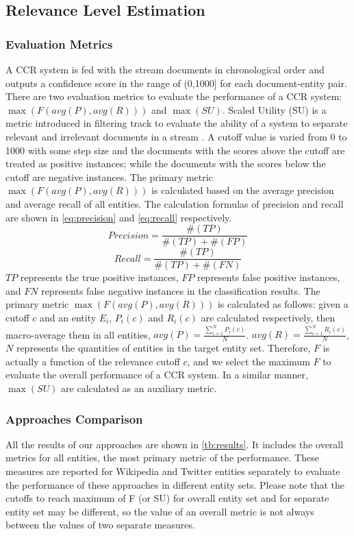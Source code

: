 \documentclass{sig-alternate}
\begin{document}
\subsection{Relevance Level Estimation}
\subsubsection{Evaluation Metrics}\label{subsec:evaluation}
A CCR system is fed with the stream documents in chronological order and outputs a confidence score in the range of (0,1000] for each document-entity pair. There are two evaluation metrics to evaluate the performance of a CCR system: $\max(F(avg(P), avg(R)))$ and $\max(SU)$. Scaled Utility (SU) is a metric introduced in filtering track to evaluate the ability of a system to separate relevant and irrelevant documents in a stream \cite{Robertson02thetrec}. A cutoff value is varied from 0 to 1000 with some step size and the documents with the scores above the cutoff are treated as positive instances; while the documents with the scores below the cutoff are negative instances. The primary metric $\max(F(avg(P), avg(R)))$ is calculated based on the average precision and average recall of all entities. The calculation formulas of precision and recall are shown in \autoref{eq:precision} and \autoref{eq:recall} respectively.
\begin{equation}\label{eq:precision}
Precision = \frac{\#(TP)}{\#(TP) + \#(FP)}
\end{equation}
\begin{equation}\label{eq:recall}
Recall = \frac{\#(TP)}{\#(TP) + \#(FN)}
\end{equation}
$TP$ represents the true positive instances, $FP$ represents false positive instances, and $FN$ represents false negative instances in the classification results.
The primary metric $\max(F(avg(P), avg(R)))$ is calculated as follows:
given a cutoff $c$ and an entity $E_{i}$, $P_{i}(c)$ and $R_{i}(c)$ are calculated respectively, then macro-average them in all entities, $avg(P)=\frac{\sum_{i=1}^{N}P_{i}(c)}{N}$. $avg(R)=\frac{\sum_{i=1}^{N}R_{i}(c)}{N}$, $N$ represents the quantities of entities in the target entity set. Therefore, $F$ is actually a function of the relevance cutoff $c$, and we select the maximum $F$ to evaluate the overall performance of a CCR system. In a similar manner, $\max(SU)$ are calculated as an auxiliary metric. 

\subsubsection{Approaches Comparison}
All the results of our approaches are shown in \autoref{tb:results}. It includes the overall metrics for all entities, the most primary metric of the performance. These measures are reported for Wikipedia and Twitter entities separately to evaluate the performance of these approaches in different entity sets. Please note that the cutoffs to reach maximum of F (or SU) for overall entity set and for separate entity set may be different, so the value of an overall metric is not always between the values of two separate measures. 
\end{document}
